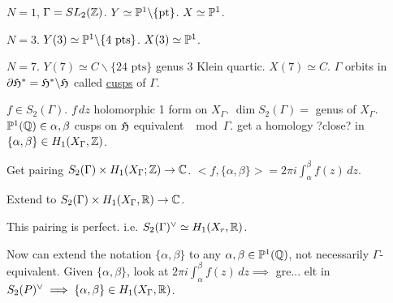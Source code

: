 \documentclass[]{article}
\begin{document}
\begin{example}
	$N=1$, $\Gamma = SL_2(\mathbb{Z})$. $Y \simeq \mathbb{P}^1 \backslash \{\text{pt}\}$. $X \simeq \mathbb{P}^1$.
\end{example}

\begin{example}
	$N=3$. $Y(3) \simeq \mathbb{P}^1 \backslash \{4\text{ pts}\}$. $X(3) \simeq \mathbb{P}^1$.
\end{example}

\begin{example}
	$N=7$. $Y(7) \simeq C \backslash \{24\text{ pts}\}$ genus 3 Klein quartic. $X(7) \simeq C$. $\Gamma$ orbits in $\partial \frak{H}^* = \frak{H}^* \backslash \frak{H}$ called \ul{cusps} of $\Gamma$.
\end{example}

$f\in S_2(\Gamma)$. $f \, dz$ holomorphic 1 form on $X_\Gamma$. $\dim S_2(\Gamma) = $ genus of $X_\Gamma$. $\mathbb{P}^1(\mathbb{Q})\in \alpha,\beta$ cusps on $\frak{H}$ equivalent $\mod \Gamma$. get a homology ?close? in $\{\alpha,\beta\}\in H_1(X_\Gamma,\mathbb{Z})$.

Get pairing $S_2(\Gamma)\times H_1(X_\Gamma;\mathbb{Z}) \rightarrow \mathbb{C}$. $<f, \{\alpha,\beta\}> = 2\pi i \int_\alpha^\beta f(z)\, dz$.

Extend to $S_2(\Gamma)\times H_1(X_\Gamma, \mathbb{R}) \rightarrow \mathbb{C}$.

\begin{theorem}
	This pairing is perfect. i.e. $S_2(\Gamma)^\vee \simeq H_1(X_r,\mathbb{R})$.
\end{theorem}
Now can extend the notation $\{\alpha,\beta\}$ to any $\alpha,\beta \in \mathbb{P}^1 (\mathbb{Q})$, not necessarily $\Gamma$-equivalent. Given $\{\alpha,\beta\}$, look at $2\pi i \int_\alpha^\beta f(z)\, dz \implies$ gre... elt in $S_2(P)^\vee \implies \{\alpha,\beta\}\in H_1(X_\Gamma,\mathbb{R})$.
\end{document}
